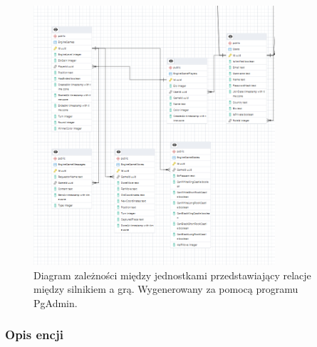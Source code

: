 \documentclass[twoside]{projektInzynierskiMS1}
\begin{document}
\vspace{0.5cm}
\begin{figure}[h!]
    \centering
    \includegraphics[width=0.8\textwidth]{images/ERD_offline.png}
    \caption{Diagram zależności między jednostkami przedstawiający relacje między silnikiem a grą. Wygenerowany za pomocą programu PgAdmin.}
\end{figure}

\newpage

\subsubsection{Opis encji}
\end{document}
